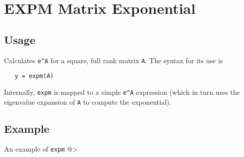 \section{EXPM Matrix Exponential}

\subsection{Usage}

Calculates \verb|e^A| for a square, full rank matrix \verb|A|.  The
syntax for its use is
\begin{verbatim}
   y = expm(A)
\end{verbatim}
Internally, \verb|expm| is mapped to a simple \verb|e^A| expression (which
in turn uses the eigenvalue expansion of \verb|A| to compute the
exponential).
\subsection{Example}

An example of \verb|expm|
@>
